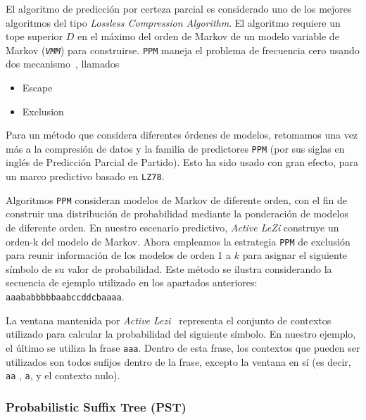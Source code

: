 El algoritmo de predicción por certeza parcial es considerado uno de los mejores algoritmos del tipo \emph{Lossless Compression Algorithm}. El algoritmo requiere un tope superior $D$ en el máximo del orden de Markov de un modelo variable de Markov (\emph{\texttt{VMM}}) para construirse. 
\texttt{PPM} maneja el problema de frecuencia cero usando dos mecanismo~\cite{Begleiter2004},  llamados
	
	\begin{itemize}
			\setlength{\itemsep}{1pt}
			\setlength{\parskip}{0pt}
			\setlength{\parsep}{0pt}
		\item Escape
		\item Exclusion
	\end{itemize}
	
Para un método que considera diferentes órdenes de modelos, retomamos una vez más a la compresión de datos y la familia de predictores \texttt{PPM}  (por sus siglas en inglés de Predicción Parcial de Partido). Esto ha sido usado con gran efecto, para un marco predictivo basado en \texttt{LZ78}. 

Algoritmos  \texttt{PPM} consideran modelos de Markov de diferente orden,  con el fin de construir una distribución de probabilidad mediante la ponderación de modelos de diferente orden. En nuestro escenario predictivo, \emph{Active LeZi} construye un orden-k del modelo de Markov. Ahora empleamos la estrategia \texttt{PPM} de exclusión para reunir información de los modelos de orden 1 a $k$ para asignar el siguiente símbolo de su valor de probabilidad. Este método se ilustra considerando la secuencia de ejemplo utilizado en los apartados anteriores: \texttt{aaababbbbbaabccddcbaaaa}.

La ventana mantenida por \emph{Active Lezi}~\cite{Gopalratnam2007} representa el conjunto de contextos utilizado para calcular la probabilidad  del siguiente símbolo. En nuestro ejemplo, el último se utiliza la frase \texttt{aaa}. Dentro de esta frase, los contextos que pueden ser utilizados son todos sufijos dentro de la frase, excepto la ventana en sí (es decir, \texttt{aa} , \texttt{a}, y el contexto nulo).

	


 \subsubsection{Probabilistic Suffix Tree (PST)}
 
